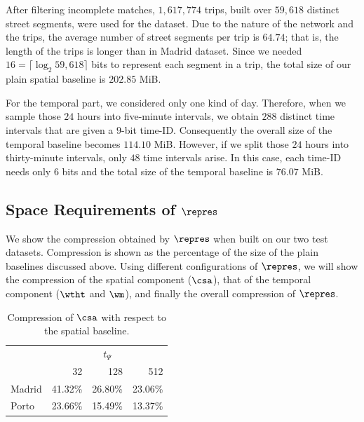 \begin{itemize}
  After filtering incomplete matches, $1,\!617,\!774$ trips, built  over $59,\!618$ distinct street segments, were used for the dataset. 
  Due to the nature of the network and the trips, 
  the average number of street segments per trip is $64.74$; that is, the length of the trips is longer than in Madrid dataset.
  Since we needed $16=\lceil\log_2 59,\!618 \rceil$ bits to represent each segment in a trip, the total size of our
  plain spatial baseline is $202.85$ MiB.

  For the temporal part, we considered only one kind of day. Therefore, when we sample those $24$ hours into five-minute intervals,
  we obtain $288$ distinct time intervals that are given a $9$-bit time-ID. Consequently the overall size of the temporal
  baseline becomes $114.10$ MiB. However, if we split those $24$ hours into thirty-minute intervals, only $48$ time intervals 
  arise. In this case, each time-ID needs only $6$ bits and the total size of the temporal baseline is $76.07$ MiB.
\end{itemize}



\subsection{Space Requirements of $\repres$}\label{sec:exp.space}
We show the compression obtained by $\repres$ when built on our two test datasets. Compression is shown
as the percentage of the size of the plain baselines discussed above.
Using different configurations of $\repres$, we will show the compression of the spatial component ($\csa$), 
that of the temporal component ($\wtht$ and $\wm$), and finally the overall compression of $\repres$.


\begin{table}[htb]
\begin{center}
\scriptsize
  \begin{tabular}{|l|*{3}{r}|}
  \cline{2-4}
  \multicolumn{1}{c|}{} & \multicolumn{3}{c|}{$t_{\Psi}$ } \\
  \multicolumn{1}{c|}{} & 32 & 128 & 512 \\
  \hline
  Madrid & 41.32\% & 26.80\% & 23.06\% \\
  Porto & 23.66\% & 15.49\% & 13.37\% \\
  \hline
  \end{tabular}
\caption{Compression of $\csa$ with respect to the spatial baseline.}
\label{table:spatial_spaces}
\vspace{-3mm}
\end{center}
\end{table}

